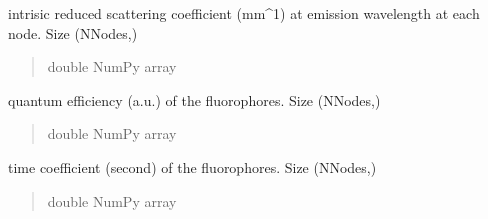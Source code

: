 \documentclass[letterpaper,10pt,english]{sphinxmanual}
\begin{document}
\begin{fulllineitems}
\begin{fulllineitems}
\begin{quote}
\begin{description}
\end{description}\end{quote}

\end{fulllineitems}


\begin{fulllineitems}
\label{\detokenize{_autosummary/nirfasterff.base.fluor_mesh.fluormesh:nirfasterff.base.fluor_mesh.fluormesh.musm}}
\pysigstartsignatures
\pysigline
{}
\pysigstopsignatures
\sphinxAtStartPar
intrisic reduced scattering coefficient (mm\textasciicircum{}\sphinxhyphen{}1) at emission wavelength at each node. Size (NNodes,)
\begin{quote}\begin{description}
\sphinxAtStartPar
double NumPy array

\end{description}\end{quote}

\end{fulllineitems}


\begin{fulllineitems}
\label{\detokenize{_autosummary/nirfasterff.base.fluor_mesh.fluormesh:nirfasterff.base.fluor_mesh.fluormesh.eta}}
\pysigstartsignatures
\pysigline
{}
\pysigstopsignatures
\sphinxAtStartPar
quantum efficiency (a.u.) of the fluorophores. Size (NNodes,)
\begin{quote}\begin{description}
\sphinxAtStartPar
double NumPy array

\end{description}\end{quote}

\end{fulllineitems}


\begin{fulllineitems}
\label{\detokenize{_autosummary/nirfasterff.base.fluor_mesh.fluormesh:nirfasterff.base.fluor_mesh.fluormesh.tau}}
\pysigstartsignatures
\pysigline
{}
\pysigstopsignatures
\sphinxAtStartPar
time coefficient (second) of the fluorophores. Size (NNodes,)
\begin{quote}\begin{description}
\sphinxAtStartPar
double NumPy array


\end{description}
\end{quote}
\end{fulllineitems}
\end{fulllineitems}
\end{document}
